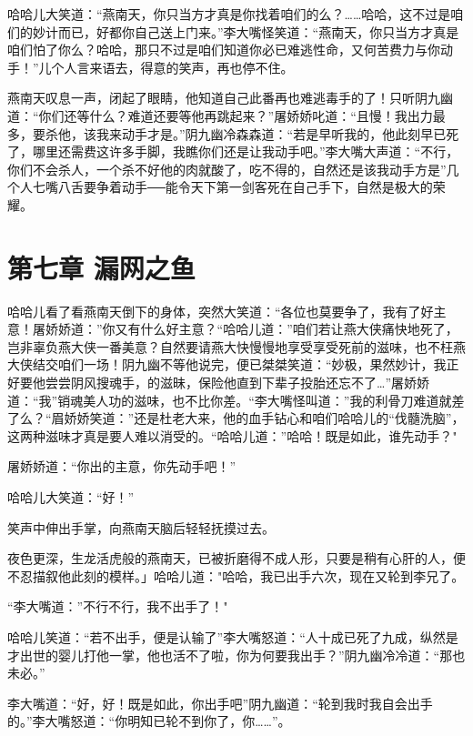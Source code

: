 \documentclass[12pt,oneside]{book}
\begin{document}
哈哈儿大笑道：``燕南天，你只当方才真是你找着咱们的么？\ldots\ldots 哈哈，这不过是咱们的妙计而已，好都你自己送上门来。''李大嘴怪笑道：``燕南天，你只当方才真是咱们怕了你么？哈哈，那只不过是咱们知道你必已难逃性命，又何苦费力与你动手！''儿个人言来语去，得意的笑声，再也停不住。

燕南天叹息一声，闭起了眼睛，他知道自己此番再也难逃毒手的了！只听阴九幽道：``你们还等什么？难道还要等他再跳起来？''屠娇娇叱道：``且慢！我出力最多，要杀他，该我来动手才是。''阴九幽冷森森道：``若是早听我的，他此刻早已死了，哪里还需费这许多手脚，我瞧你们还是让我动手吧。''李大嘴大声道：``不行，你们不会杀人，一个杀不好他的肉就酸了，吃不得的，自然还是该我动手方是''几个人七嘴八舌要争着动手──能令天下第一剑客死在自己手下，自然是极大的荣耀。

\hypertarget{ux7b2cux4e03ux7ae0-ux6f0fux7f51ux4e4bux9c7c}{%
\chapter{第七章
漏网之鱼}\label{ux7b2cux4e03ux7ae0-ux6f0fux7f51ux4e4bux9c7c}}

哈哈儿看了看燕南天倒下的身体，突然大笑道：``各位也莫要争了，我有了好主意！屠娇娇道：''你又有什么好主意？``哈哈儿道：''咱们若让燕大侠痛快地死了，岂非辜负燕大侠一番美意？自然要请燕大快慢慢地享受享受死前的滋味，也不枉燕大侠结交咱们一场！阴九幽不等他说完，便已桀桀笑道：``妙极，果然妙计，我正好要他尝尝阴风搜魂手，的滋昧，保险他直到下辈子投胎还忘不了\ldots{}''屠娇娇道：``我''销魂美人功的滋味，也不比你差。``李大嘴怪叫道：''我的利骨刀难道就差了么？``眉娇娇笑道：''还是杜老大来，他的血手钻心和咱们哈哈儿的``伐髓洗脑''，这两种滋味才真是要人难以消受的。``哈哈儿道：''哈哈！既是如此，谁先动手？"

屠娇娇道：``你出的主意，你先动手吧！''

哈哈儿大笑道：``好！''

笑声中伸出手掌，向燕南天脑后轻轻抚摸过去。

夜色更深，生龙活虎般的燕南天，已被折磨得不成人形，只要是稍有心肝的人，便不忍描叙他此刻的模样。」哈哈儿道："哈哈，我已出手六次，现在又轮到李兄了。

``李大嘴道：''不行不行，我不出手了！"

哈哈儿笑道：``若不出手，便是认输了''李大嘴怒道：``人十成已死了九成，纵然是才出世的婴儿打他一掌，他也活不了啦，你为何要我出手？''阴九幽冷冷道：``那也未必。''

李大嘴道：``好，好！既是如此，你出手吧''阴九幽道：``轮到我时我自会出手的。''李大嘴怒道：``你明知已轮不到你了，你\ldots\ldots{}''。
\end{document}

